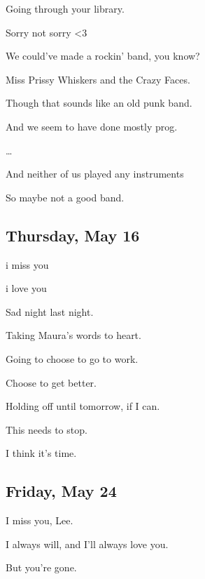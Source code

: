 { Going through your library.

 Sorry not sorry \textless{}3

 We could've made a rockin' band, you know?

 Miss Prissy Whiskers and the Crazy Faces.

 Though that sounds like an old punk band.

 And we seem to have done mostly prog.

\ldots{}

 And neither of us played any instruments

 So maybe not a good band.

\newpage

\subsection*{Thursday, May 16}\label{thursday-may-16}

 i miss you

 i love you

 Sad night last night.

 Taking Maura's words to heart.

 Going to choose to go to work.

 Choose to get better.

 Holding off until tomorrow, if I can.

 This needs to stop.

 I think it's time.

\newpage

\subsection*{Friday, May 24}\label{friday-may-24}

 I miss you, Lee.

 I always will, and I'll always love you.

 But you're gone.

}
